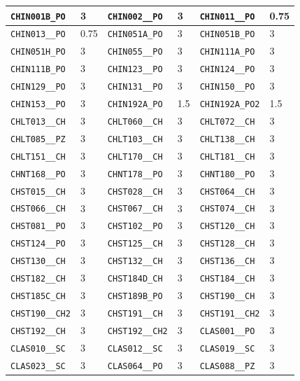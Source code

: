 \begin{longtable}{|l|l||l|l||l|l|}
    \verb|CHIN001B_PO| & 3 & \verb|CHIN002__PO| & 3 & \verb|CHIN011__PO| & 0.75\\\hline
    \verb|CHIN013__PO| & 0.75 & \verb|CHIN051A_PO| & 3 & \verb|CHIN051B_PO| & 3\\\hline
    \verb|CHIN051H_PO| & 3 & \verb|CHIN055__PO| & 3 & \verb|CHIN111A_PO| & 3\\\hline
    \verb|CHIN111B_PO| & 3 & \verb|CHIN123__PO| & 3 & \verb|CHIN124__PO| & 3\\\hline
    \verb|CHIN129__PO| & 3 & \verb|CHIN131__PO| & 3 & \verb|CHIN150__PO| & 3\\\hline
    \verb|CHIN153__PO| & 3 & \verb|CHIN192A_PO| & 1.5 & \verb|CHIN192A_PO2| & 1.5\\\hline
    \verb|CHLT013__CH| & 3 & \verb|CHLT060__CH| & 3 & \verb|CHLT072__CH| & 3\\\hline
    \verb|CHLT085__PZ| & 3 & \verb|CHLT103__CH| & 3 & \verb|CHLT138__CH| & 3\\\hline
    \verb|CHLT151__CH| & 3 & \verb|CHLT170__CH| & 3 & \verb|CHLT181__CH| & 3\\\hline
    \verb|CHNT168__PO| & 3 & \verb|CHNT178__PO| & 3 & \verb|CHNT180__PO| & 3\\\hline
    \verb|CHST015__CH| & 3 & \verb|CHST028__CH| & 3 & \verb|CHST064__CH| & 3\\\hline
    \verb|CHST066__CH| & 3 & \verb|CHST067__CH| & 3 & \verb|CHST074__CH| & 3\\\hline
    \verb|CHST081__PO| & 3 & \verb|CHST102__PO| & 3 & \verb|CHST120__CH| & 3\\\hline
    \verb|CHST124__PO| & 3 & \verb|CHST125__CH| & 3 & \verb|CHST128__CH| & 3\\\hline
    \verb|CHST130__CH| & 3 & \verb|CHST132__CH| & 3 & \verb|CHST136__CH| & 3\\\hline
    \verb|CHST182__CH| & 3 & \verb|CHST184D_CH| & 3 & \verb|CHST184__CH| & 3\\\hline
    \verb|CHST185C_CH| & 3 & \verb|CHST189B_PO| & 3 & \verb|CHST190__CH| & 3\\\hline
    \verb|CHST190__CH2| & 3 & \verb|CHST191__CH| & 3 & \verb|CHST191__CH2| & 3\\\hline
    \verb|CHST192__CH| & 3 & \verb|CHST192__CH2| & 3 & \verb|CLAS001__PO| & 3\\\hline
    \verb|CLAS010__SC| & 3 & \verb|CLAS012__SC| & 3 & \verb|CLAS019__SC| & 3\\\hline
    \verb|CLAS023__SC| & 3 & \verb|CLAS064__PO| & 3 & \verb|CLAS088__PZ| & 3\\\hline

\end{longtable}
